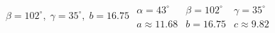 { $\beta = 102^{\circ}, \; \gamma = 35^{\circ}, \; b = 16.75$}
{$\begin{array}{lll}\alpha = 43^{\circ} & \beta = 102^{\circ} & \gamma = 35^{\circ} \\a \approx 11.68 & b = 16.75 & c \approx 9.82 \end{array}$}
